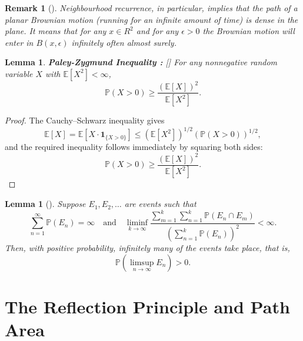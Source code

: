 \documentclass[11pt, a4paper, oneside]{report}
\numberwithin{equation}{section}
\newtheorem{lemma}[theorem]{Lemma}
\newtheorem{remark}[theorem]{Remark}
\begin{document}
\begin{remark}[{\cite[Remark 3.21]{PeresMortersBook}}]
\textit{Neighbourhood recurrence}, in particular, implies that the path of a planar Brownian motion (running for an infinite amount of time) is dense in the plane. It means that for any \(x \in R^2\) and for any \( \epsilon > 0\) the Brownian motion will enter in \(B(x,\epsilon)\) infinitely often almost surely.
\end{remark}
\begin{lemma}
\textbf{Paley-Zygmund Inequality : } [{\cite[Lemma 3.23]{PeresMortersBook}}]
For any nonnegative random variable \( X \) with \( \mathbb{E}[X^2] < \infty \),
\[
\mathbb{P}(X > 0) \geq \frac{(\mathbb{E}[X])^2}{\mathbb{E}[X^2]}.
\]
\end{lemma}
\begin{proof}
The Cauchy–Schwarz inequality gives
\[
\mathbb{E}[X] = \mathbb{E}[X \cdot \mathbf{1}_{\{X > 0\}}] \leq \left(\mathbb{E}[X^2]\right)^{1/2} \left(\mathbb{P}(X > 0)\right)^{1/2},
\]
and the required inequality follows immediately by squaring both sides:
\[
\mathbb{P}(X > 0) \geq \frac{(\mathbb{E}[X])^2}{\mathbb{E}[X^2]}.
\]
\end{proof}
\begin{lemma}[{\cite[Lemma 3.24]{PeresMortersBook}}]
Suppose \( E_1, E_2, \ldots \) are events such that
\[
\sum_{n=1}^\infty \mathbb{P}(E_n) = \infty
\quad \text{and} \quad
\liminf_{k \to \infty} \frac{\sum_{m=1}^k \sum_{n=1}^k \mathbb{P}(E_n \cap E_m)}{\left( \sum_{n=1}^k \mathbb{P}(E_n) \right)^2} < \infty.
\]
Then, with positive probability, infinitely many of the events take place, that is,
\[
\mathbb{P} \left( \limsup_{n \to \infty} E_n \right) > 0.
\]
\end{lemma}
\chapter{The Reflection Principle and Path Area }
\end{document}
